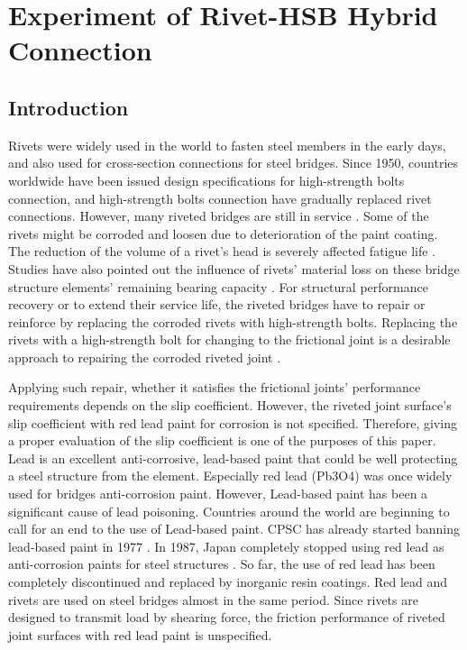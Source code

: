 \chapter{Experiment of Rivet-HSB Hybrid Connection}
\label{ch3}

\begin{spacing}{1.25} %
\minitoc %
\end{spacing} %
\onehalfspacing %
\section{Introduction}


Rivets were widely used in the world to fasten steel members in the early days, and also used for cross-section connections for steel bridges. Since 1950, countries worldwide have been issued design specifications for high-strength bolts connection, and high-strength bolts connection have gradually replaced rivet connections. However, many riveted bridges are still in service \cite{Collette2014Experimental1880s1890s}. Some of the rivets might be corroded and loosen due to deterioration of the paint coating. The reduction of the volume of a rivet's head is severely affected fatigue life \cite{Heinemeyer2011TheConnections}. Studies have also pointed out the influence of rivets' material loss on these bridge structure elements' remaining bearing capacity \cite{Hashimoto2010,Macho2016}. For structural performance recovery or to extend their service life, the riveted bridges have to repair or reinforce by replacing the corroded rivets with high-strength bolts. Replacing the rivets with a high-strength bolt for changing to the frictional joint is a desirable approach to repairing the corroded riveted joint \cite{KOMATSU2015}.
    
Applying such repair, whether it satisfies the frictional joints' performance requirements depends on the slip coefficient. However, the riveted joint surface's slip coefficient with red lead paint for corrosion is not specified. Therefore, giving a proper evaluation of the slip coefficient is one of the purposes of this paper.
Lead is an excellent anti-corrosive, lead-based paint that could be well protecting a steel structure from the element. Especially red lead (Pb3O4) was once widely used for bridges anti-corrosion paint. However, Lead-based paint has been a significant cause of lead poisoning. Countries around the world are beginning to call for an end to the use of Lead-based paint. \ac{CPSC} has already started banning lead-based paint in 1977 \cite{CPSC1977}. In 1987, Japan completely stopped using red lead as anti-corrosion paints for steel structures \cite{rtri1987Steel}. So far, the use of red lead has been completely discontinued and replaced by inorganic resin coatings. Red lead and rivets are used on steel bridges almost in the same period. Since rivets are designed to transmit load by shearing force, the friction performance of riveted joint surfaces with red lead paint is unspecified. 

